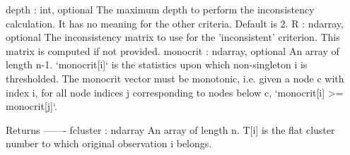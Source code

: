 \begin{DoxyVerb}
depth : int, optional
    The maximum depth to perform the inconsistency calculation.
    It has no meaning for the other criteria. Default is 2.
R : ndarray, optional
    The inconsistency matrix to use for the 'inconsistent'
    criterion. This matrix is computed if not provided.
monocrit : ndarray, optional
    An array of length n-1. `monocrit[i]` is the
    statistics upon which non-singleton i is thresholded. The
    monocrit vector must be monotonic, i.e. given a node c with
    index i, for all node indices j corresponding to nodes
    below c, `monocrit[i] >= monocrit[j]`.

Returns
-------
fcluster : ndarray
    An array of length n. T[i] is the flat cluster number to
    which original observation i belongs.\end{DoxyVerb}
 \hypertarget{namespacescipy_1_1cluster_1_1hierarchy_a098505df307702564c947c14783dd2b5}{}
